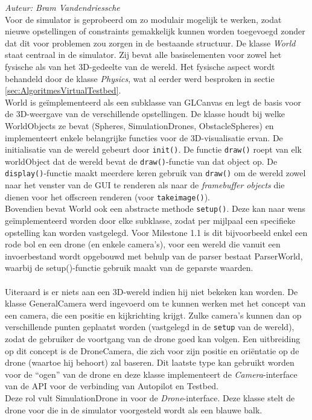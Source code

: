 {\em Auteur: Bram Vandendriessche}
\\

\noindent
Voor de simulator is geprobeerd om zo modulair mogelijk te werken, zodat nieuwe opstellingen of constraints gemakkelijk kunnen worden toegevoegd zonder dat dit voor problemen zou zorgen in de bestaande structuur. De klasse \textit{World} staat centraal in de simulator. Zij bevat alle basiselementen voor zowel het fysische als van het 3D-gedeelte van de wereld. Het fysische aspect wordt behandeld door de klasse \textit{Physics}, wat al eerder werd besproken in sectie \ref{sec:AlgoritmesVirtualTestbed}. 
\\

\noindent
World is ge\"implementeerd als een subklasse van GLCanvas en legt de basis voor de 3D-weergave van de verschillende opstellingen. 
De klasse houdt bij welke WorldObjects ze bevat (Spheres, SimulationDrones, ObstacleSpheres) en implementeert enkele belangrijke functies voor de 3D-visualisatie ervan. De initialisatie van de wereld gebeurt door \texttt{init()}. De functie \texttt{draw()} roept van elk worldObject dat de wereld bevat de \texttt{draw()}-functie van dat object op. De \texttt{display()}-functie maakt meerdere keren gebruik van \texttt{draw()} om de wereld zowel naar het venster van de GUI te renderen als naar de \textit{framebuffer objects} die dienen voor het offscreen renderen (voor \texttt{takeimage()}).\\
Bovendien bevat World ook een abstracte methode \texttt{setup()}. Deze kan naar wens ge\"implementeerd worden door elke subklasse, zodat per mijlpaal een specifieke opstelling kan worden vastgelegd. Voor Milestone 1.1 is dit bijvoorbeeld enkel een rode bol en een drone (en enkele camera's), voor een wereld die vanuit een invoerbestand wordt opgebouwd met behulp van de parser bestaat ParserWorld, waarbij de setup()-functie gebruik maakt van de geparste waarden.\\
\\
Uiteraard is er niets aan een 3D-wereld indien hij niet bekeken kan worden. De klasse GeneralCamera werd ingevoerd om te kunnen werken met het concept van een camera, die een positie en kijkrichting krijgt. Zulke camera's kunnen dan op verschillende punten geplaatst worden (vastgelegd in de \texttt{setup} van de wereld), zodat de gebruiker de voortgang van de drone goed kan volgen. Een uitbreiding op dit concept is de DroneCamera, die zich voor zijn positie en ori\"entatie op de drone (waartoe hij behoort) zal baseren. Dit laatste type kan gebruikt worden voor de ``ogen'' van de drone en deze klasse implementeert de \textit{Camera}-interface van de API voor de verbinding van Autopilot en Testbed.\\
Deze rol vult SimulationDrone in voor de \textit{Drone}-interface. Deze klasse stelt de drone voor die in de simulator voorgesteld wordt als een blauwe balk. 

